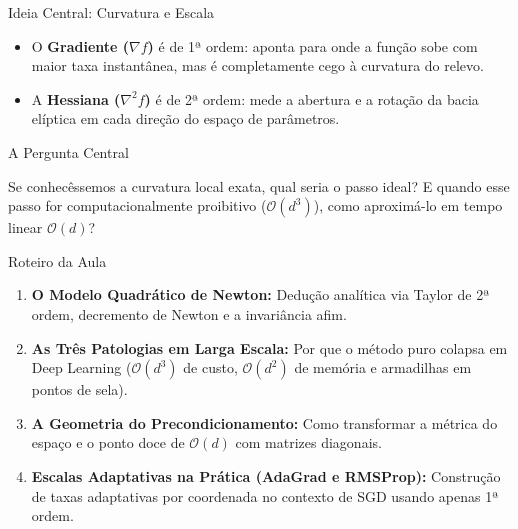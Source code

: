 \documentclass[aspectratio=169, 10pt]{beamer}
\newenvironment{calloutimportant}[1][Importante]{%
  \begin{alertblock}{#1}%
}{%
  \end{alertblock}%
}
\begin{document}
\begin{frame}{Ideia Central: Curvatura e Escala}
  \begin{itemize}
    \item O \textbf{Gradiente ($\nabla f$)} é de 1ª ordem: aponta para onde a função sobe com maior taxa instantânea, mas é completamente cego à curvatura do relevo.
    \vspace{0.3cm}
    \item A \textbf{Hessiana ($\nabla^2 f$)} é de 2ª ordem: mede a abertura e a rotação da bacia elíptica em cada direção do espaço de parâmetros.
  \end{itemize}
  \vspace{0.4cm}
  \begin{calloutimportant}[A Pergunta Central]
    Se conhecêssemos a curvatura local exata, qual seria o passo ideal? E quando esse passo for computacionalmente proibitivo ($\mathcal{O}(d^3)$), como aproximá-lo em tempo linear $\mathcal{O}(d)$?
  \end{calloutimportant}
\end{frame}

\begin{frame}{Roteiro da Aula}
  \begin{enumerate}
    \item \textbf{O Modelo Quadrático de Newton:} Dedução analítica via Taylor de 2ª ordem, decremento de Newton e a invariância afim.
    \vspace{0.2cm}
    \item \textbf{As Três Patologias em Larga Escala:} Por que o método puro colapsa em Deep Learning ($\mathcal{O}(d^3)$ de custo, $\mathcal{O}(d^2)$ de memória e armadilhas em pontos de sela).
    \vspace{0.2cm}
    \item \textbf{A Geometria do Precondicionamento:} Como transformar a métrica do espaço e o ponto doce de $\mathcal{O}(d)$ com matrizes diagonais.
    \vspace{0.2cm}
    \item \textbf{Escalas Adaptativas na Prática (AdaGrad e RMSProp):} Construção de taxas adaptativas por coordenada no contexto de SGD usando apenas 1ª ordem.
  \end{enumerate}
\end{frame}
\end{document}

